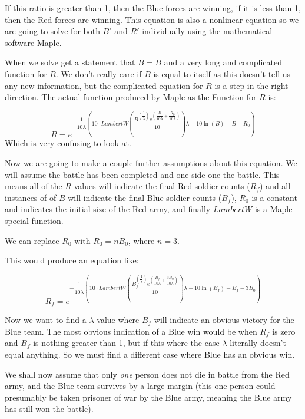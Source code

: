 \documentclass[12pt]{report}
\begin{document}
If this ratio is greater than 1, then the Blue forces are winning, if it is less than 1, then the Red forces are winning. This equation is also a nonlinear equation so we are going to solve for both $B'$ and $R'$ individually using the mathematical software Maple. 

When we solve get a statement that $B=B$ and a very long and complicated function for $R$. We don't really care if $B$ is equal to itself as this doesn't tell us any new information, but the complicated equation for $R$ is a step in the right direction. The actual function produced by Maple as the Function for $R$ is:

$$R=e^{-\dfrac{1}{10\lambda}\left(10\cdot LambertW\left(\dfrac{B^{\left(\dfrac{1}{\lambda}\right)}e^{\left(\dfrac{B}{10\lambda}+\dfrac{R_0}{10\lambda}\right)}}{10}\right)\lambda-10\ln{(B)}-B-R_0\right)}$$
\bigskip
Which is very confusing to look at. 

Now we are going to make a couple further assumptions about this equation. We will assume the battle has been completed and one side one the battle. This means all of the $R$ values will indicate the final Red soldier counts ($R_f$) and all instances of of $B$ will indicate the final Blue soldier counts ($B_f$), $R_0$ is a constant and indicates the initial size of the Red army, and finally $LambertW$ is a Maple special function.

\bigskip

We can replace $R_0$ with $R_0=nB_0$, where $n=3$.

This would produce an equation like:

$$R_f=e^{-\dfrac{1}{10\lambda}\left(10\cdot LambertW\left(\dfrac{B_f^{\left(\dfrac{1}{\lambda}\right)}e^{\left(\dfrac{B_f}{10\lambda}+\dfrac{3B_0}{10\lambda}\right)}}{10}\right)\lambda-10\ln{(B_f)}-B_f-3B_0\right)}$$

\medskip

Now we want to find a $\lambda$ value where $B_f$ will indicate an obvious victory for the Blue team. The most obvious indication of a Blue win would be when $R_f$ is zero and $B_f$ is nothing greater than 1, but if this where the case $\lambda$ literally doesn't equal anything. So we must find a different case where Blue has an obvious win.

\medskip

We shall now assume that only \emph{one} person does not die in battle from the Red army, and the Blue team survives by a large margin (this one person could presumably be taken prisoner of war by the Blue army, meaning the Blue army has still won the battle).
\end{document}
